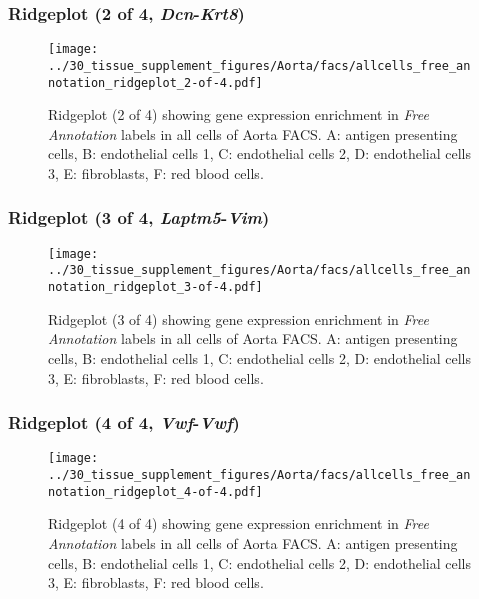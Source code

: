 \clearpage

\subsubsection{Ridgeplot (2 of 4, \emph{Dcn}-\emph{Krt8})}
\begin{figure}[h]
\centering
\texttt{[image: ../30\_tissue\_supplement\_figures/Aorta/facs/allcells\_free\_annotation\_ridgeplot\_2-of-4.pdf]}

\caption{ Ridgeplot (2 of 4)  showing gene expression enrichment in \emph{Free Annotation} labels in all cells of Aorta FACS. A: antigen presenting cells, B: endothelial cells 1, C: endothelial cells 2, D: endothelial cells 3, E: fibroblasts, F: red blood cells.}
\end{figure}


\clearpage

\subsubsection{Ridgeplot (3 of 4, \emph{Laptm5}-\emph{Vim})}
\begin{figure}[h]
\centering
\texttt{[image: ../30\_tissue\_supplement\_figures/Aorta/facs/allcells\_free\_annotation\_ridgeplot\_3-of-4.pdf]}

\caption{ Ridgeplot (3 of 4)  showing gene expression enrichment in \emph{Free Annotation} labels in all cells of Aorta FACS. A: antigen presenting cells, B: endothelial cells 1, C: endothelial cells 2, D: endothelial cells 3, E: fibroblasts, F: red blood cells.}
\end{figure}


\clearpage

\subsubsection{Ridgeplot (4 of 4, \emph{Vwf}-\emph{Vwf})}
\begin{figure}[h]
\centering
\texttt{[image: ../30\_tissue\_supplement\_figures/Aorta/facs/allcells\_free\_annotation\_ridgeplot\_4-of-4.pdf]}

\caption{ Ridgeplot (4 of 4)  showing gene expression enrichment in \emph{Free Annotation} labels in all cells of Aorta FACS. A: antigen presenting cells, B: endothelial cells 1, C: endothelial cells 2, D: endothelial cells 3, E: fibroblasts, F: red blood cells.}
\end{figure}


